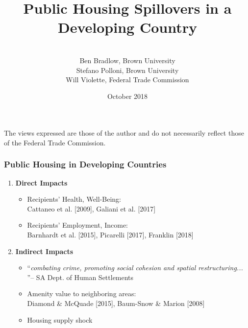 \documentclass[aspectratio=32]{beamer}
\title{Public Housing Spillovers in a Developing Country} %
\author{\\Ben Bradlow, Brown University \\ Stefano Polloni, Brown University\\ Will Violette, Federal Trade Commission}
\date{October 2018} %
\begin{document}
\beamertemplatenavigationsymbolsempty

\begin{frame}
\titlepage %

The views expressed are those of the author and do not necessarily reflect those of the Federal Trade Commission.
\end{frame}


\begin{frame}
\frametitle{Public Housing in Developing Countries}
\centering


\begin{enumerate}

  \item<1-> {\bf Direct Impacts}
  \vspace{2mm}
  \begin{itemize}
      \item {Recipients' Health, Well-Being}: \\  Cattaneo et al. [2009], Galiani et al. [2017]
      \vspace{1mm}
      \item {Recipients' Employment, Income}: \\ Barnhardt et al. [2015], Picarelli [2017], Franklin [2018]
    \end{itemize}
  \vspace{2mm}
  \item<2-> {\bf Indirect Impacts}
  \begin{itemize}
  \vspace{2mm}
      \item ``{\it combating crime, promoting social cohesion and spatial restructuring...} ''{\footnotesize -- SA Dept. of Human Settlements}
      \vspace{1mm}
      \item Amenity value to neighboring areas: \\ Diamond \& McQuade [2015], Baum-Snow \& Marion [2008]
      \vspace{1mm}
      \item Housing supply shock
    \end{itemize}
\end{enumerate}

\end{frame}
\end{document}
